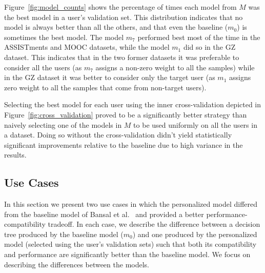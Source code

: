 \documentclass[letterpaper]{article} %
\theoremstyle{definition}
\begin{document}
Figure~\ref{fig:model_counts} shows the percentage of times each model from $M$ was the best model in a user's validation set. This distribution indicates that no model is always better than all the others, and that even the baseline ($m_0$) is sometimes the best model.
%
The model $m_7$ performed best most of the time in the ASSISTments and MOOC datasets, while the model $m_1$ did so in the GZ dataset. This indicates that in the two former datasets it was preferable to consider all the users (as $m_7$ assigns a non-zero weight to all the samples) while in the GZ dataset it was better to consider only the target user (as $m_1$ assigns zero weight to all the samples that come from non-target users).

Selecting the best model for each user using the inner cross-validation depicted in Figure~\ref{fig:cross_validation} proved to be a significantly better strategy than naively selecting one of the models in $M$ to be used uniformly on all the users in a dataset. Doing so without the cross-validation didn't yield statistically significant improvements relative to the baseline due to high variance in the results.

\subsection{Use Cases}
\label{sec:user_cases}
%
In this section we present two use cases in which the personalized model differed from the baseline model of Bansal et al.~ and provided a better performance-compatibility tradeoff.
In each case, we describe the difference between a decision tree produced by the baseline model ($m_0$) and one produced by the personalized model (selected using the user's validation sets) such that both its compatibility and performance are significantly better than the baseline model.  
We focus on describing the differences between the models. 
\end{document}
